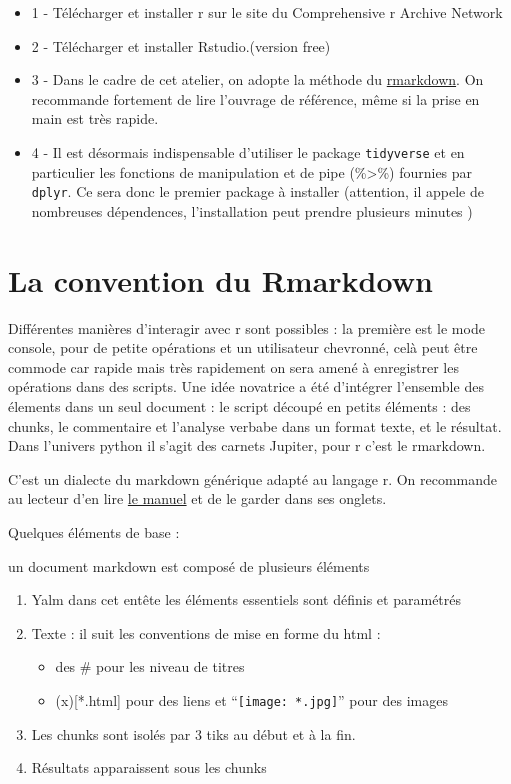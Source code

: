 \documentclass[
]{book}
\providecommand{\tightlist}{%
  \setlength{\itemsep}{0pt}\setlength{\parskip}{0pt}}
\begin{document}
\begin{itemize}
\tightlist
\item
  1 - Télécharger et installer r sur le site du Comprehensive r Archive Network
\item
  2 - Télécharger et installer Rstudio.(version free)
\item
  3 - Dans le cadre de cet atelier, on adopte la méthode du \href{https://rmarkdown.rstudio.com/lesson-1.html}{rmarkdown}. On recommande fortement de lire l'ouvrage de référence, même si la prise en main est très rapide.
\item
  4 - Il est désormais indispensable d'utiliser le package \texttt{tidyverse} et en particulier les fonctions de manipulation et de pipe (\%\textgreater\%) fournies par \texttt{dplyr}. Ce sera donc le premier package à installer (attention, il appele de nombreuses dépendences, l'installation peut prendre plusieurs minutes )
\end{itemize}

\hypertarget{la-convention-du-rmarkdown}{%
\section{La convention du Rmarkdown}\label{la-convention-du-rmarkdown}}

Différentes manières d'interagir avec r sont possibles : la première est le mode console, pour de petite opérations et un utilisateur chevronné, celà peut être commode car rapide mais très rapidement on sera amené à enregistrer les opérations dans des scripts. Une idée novatrice a été d'intégrer l'ensemble des élements dans un seul document : le script découpé en petits éléments : des chunks, le commentaire et l'analyse verbabe dans un format texte, et le résultat. Dans l'univers python il s'agit des carnets Jupiter, pour r c'est le rmarkdown.

C'est un dialecte du markdown générique adapté au langage r. On recommande au lecteur d'en lire \href{https://bookdown.org/yihui/rmarkdown/}{le manuel} et de le garder dans ses onglets.

Quelques éléments de base :

un document markdown est composé de plusieurs éléments

\begin{enumerate}
\def\labelenumi{\arabic{enumi}.}
\tightlist
\item
  Yalm dans cet entête les éléments essentiels sont définis et paramétrés
\item
  Texte : il suit les conventions de mise en forme du html :

  \begin{itemize}
  \tightlist
  \item
    des \# pour les niveau de titres
  \item
    (x){[}*.html{]} pour des liens et ``\texttt{[image: *.jpg]}'' pour des images
  \end{itemize}
\item
  Les chunks sont isolés par 3 tiks au début et à la fin.
\item
  Résultats apparaissent sous les chunks
\end{enumerate}
\end{document}
